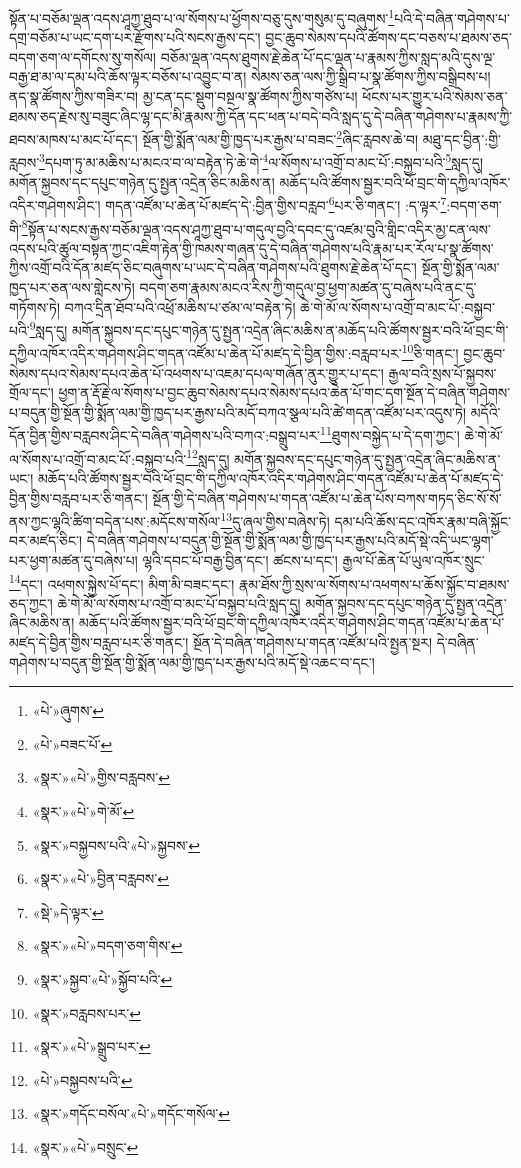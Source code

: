 སྟོན་པ་བཅོམ་ལྡན་འདས་ཤཱཀྱ་ཐུབ་པ་ལ་སོགས་པ་ཕྱོགས་བཅུ་དུས་གསུམ་དུ་བཞུགས་\footnote{«པེ་»ཞུགས་}པའི་དེ་བཞིན་གཤེགས་པ་དགྲ་བཅོམ་པ་ཡང་དག་པར་རྫོགས་པའི་སངས་རྒྱས་དང་། བྱང་ཆུབ་སེམས་དཔའི་ཚོགས་དང་བཅས་པ་ཐམས་ཅད་བདག་ཅག་ལ་དགོངས་སུ་གསོལ། བཅོམ་ལྡན་འདས་ཐུགས་རྗེ་ཆེན་པོ་དང་ལྡན་པ་རྣམས་ཀྱིས་སླད་མའི་དུས་ལྔ་བརྒྱ་ཐ་མ་ལ་དམ་པའི་ཆོས་ལྟར་བཅོས་པ་འབྱུང་བ་ན། སེམས་ཅན་ལས་ཀྱི་སྒྲིབ་པ་སྣ་ཚོགས་ཀྱིས་བསྒྲིབས་པ། ནད་སྣ་ཚོགས་ཀྱིས་གཟིར་བ། མྱ་ངན་དང་སྡུག་བསྔལ་སྣ་ཚོགས་ཀྱིས་གཙེས་པ། ཕོངས་པར་གྱུར་པའི་སེམས་ཅན་ཐམས་ཅད་རྗེས་སུ་བཟུང་ཞིང་ལྷ་དང་མི་རྣམས་ཀྱི་དོན་དང་ཕན་པ་བདེ་བའི་སླད་དུ་དེ་བཞིན་གཤེགས་པ་རྣམས་ཀྱི་ཐབས་མཁས་པ་མང་པོ་དང་། སྔོན་གྱི་སྨོན་ལམ་གྱི་ཁྱད་པར་རྒྱས་པ་བཟང་\footnote{«པེ་»བཟང་པོ་}ཞིང་རླབས་ཆེ་བ། མཐུ་དང་བྱིན་:གྱི་རླབས་\footnote{«སྣར་»«པེ་»གྱིས་བརླབས་}དཔག་ཏུ་མ་མཆིས་པ་མངའ་བ་ལ་བརྟེན་ཏེ་ཆེ་གེ་\footnote{«སྣར་»«པེ་»གེ་མོ་}ལ་སོགས་པ་འགྲོ་བ་མང་པོ་:བསྐྱབ་པའི་\footnote{«སྣར་»བསྐྱབས་པའི་«པེ་»སྐྱབས་}སླད་དུ། མགོན་སྐྱབས་དང་དཔུང་གཉེན་དུ་སྤྱན་འདྲེན་ཅིང་མཆིས་ན། མཆོད་པའི་ཚོགས་སྦྱར་བའི་ཕོ་བྲང་གི་དཀྱིལ་འཁོར་འདིར་གཤེགས་ཤིང་། གདན་འཛོམ་པ་ཆེན་པོ་མཛད་དེ་:བྱིན་གྱིས་བརླབ་\footnote{«སྣར་»«པེ་»བྱིན་བརླབས་}པར་ཅི་གནང་། :ད་ལྟར་\footnote{«སྡེ་»དེ་ལྟར་}:བདག་ཅག་གི་\footnote{«སྣར་»«པེ་»བདག་ཅག་གིས་}སྟོན་པ་སངས་རྒྱས་བཅོམ་ལྡན་འདས་ཤཱཀྱ་ཐུབ་པ་གདུལ་བྱའི་དབང་དུ་འཛམ་བུའི་གླིང་འདིར་མྱ་ངན་ལས་འདས་པའི་ཚུལ་བསྟན་ཀྱང་འཇིག་རྟེན་གྱི་ཁམས་གཞན་དུ་དེ་བཞིན་གཤེགས་པའི་རྣམ་པར་རོལ་པ་སྣ་ཚོགས་ཀྱིས་འགྲོ་བའི་དོན་མཛད་ཅིང་བཞུགས་པ་ཡང་དེ་བཞིན་གཤེགས་པའི་ཐུགས་རྗེ་ཆེན་པོ་དང་། སྔོན་གྱི་སྨོན་ལམ་ཁྱད་པར་ཅན་ལས་གླེངས་ཏེ། བདག་ཅག་རྣམས་མངའ་རིས་ཀྱི་གདུལ་བྱ་ཕྱག་མཚན་དུ་བཞེས་པའི་ནང་དུ་གཏོགས་ཏེ། བཀའ་དྲིན་ཐོབ་པའི་འཕྲོ་མཆིས་པ་ཙམ་ལ་བརྟེན་ཏེ། ཆེ་གེ་མོ་ལ་སོགས་པ་འགྲོ་བ་མང་པོ་:བསྐྱབ་པའི་\footnote{«སྣར་»སྐྱབ་«པེ་»སྐྱོབ་པའི་}སླད་དུ། མགོན་སྐྱབས་དང་དཔུང་གཉེན་དུ་སྤྱན་འདྲེན་ཞིང་མཆིས་ན་མཆོད་པའི་ཚོགས་སྦྱར་བའི་ཕོ་བྲང་གི་དཀྱིལ་འཁོར་འདིར་གཤེགས་ཤིང་གདན་འཛོམ་པ་ཆེན་པོ་མཛད་དེ་བྱིན་གྱིས་:བརླབ་པར་\footnote{«སྣར་»བརླབས་པར་}ཅི་གནང་། བྱང་ཆུབ་སེམས་དཔའ་སེམས་དཔའ་ཆེན་པོ་འཕགས་པ་འཇམ་དཔལ་གཞོན་ནུར་གྱུར་པ་དང་། རྒྱལ་བའི་སྲས་པོ་སྐྱབས་གྲོལ་དང་། ཕྱག་ན་རྡོ་རྗེ་ལ་སོགས་པ་བྱང་ཆུབ་སེམས་དཔའ་སེམས་དཔའ་ཆེན་པོ་གང་དག་སྔོན་དེ་བཞིན་གཤེགས་པ་བདུན་གྱི་སྔོན་གྱི་སྨོན་ལམ་གྱི་ཁྱད་པར་རྒྱས་པའི་མདོ་བཀའ་སྩལ་པའི་ཚེ་གདན་འཛོམ་པར་འདུས་ཏེ། མདོའི་དོན་བྱིན་གྱིས་བརླབས་ཤིང་དེ་བཞིན་གཤེགས་པའི་བཀའ་:བསྒྲུབ་པར་\footnote{«སྣར་»«པེ་»སྒྲུབ་པར་}ཐུགས་བསྐྱེད་པ་དེ་དག་ཀྱང་། ཆེ་གེ་མོ་ལ་སོགས་པ་འགྲོ་བ་མང་པོ་:བསྐྱབ་པའི་\footnote{«པེ་»བསྐྱབས་པའི་}སླད་དུ། མགོན་སྐྱབས་དང་དཔུང་གཉེན་དུ་སྤྱན་འདྲེན་ཞིང་མཆིས་ན་ཡང་། མཆོད་པའི་ཚོགས་སྦྱར་བའི་ཕོ་བྲང་གི་དཀྱིལ་འཁོར་འདིར་གཤེགས་ཤིང་གདན་འཛོམ་པ་ཆེན་པོ་མཛད་དེ་བྱིན་གྱིས་བརླབ་པར་ཅི་གནང་། སྔོན་གྱི་དེ་བཞིན་གཤེགས་པ་གདན་འཛོམ་པ་ཆེན་པོས་བཀས་གཏད་ཅིང་སོ་སོ་ནས་ཀྱང་ལྷའི་ཚིག་བདེན་པས་:མདོངས་གསོལ་\footnote{«སྣར་»གདོང་བསོལ་«པེ་»གདོང་གསོལ་}དུ་ཞལ་གྱིས་བཞེས་ཏེ། དམ་པའི་ཆོས་དང་འཁོར་རྣམ་བཞི་སྐྱོང་བར་མཛད་ཅིང་། དེ་བཞིན་གཤེགས་པ་བདུན་གྱི་སྔོན་གྱི་སྨོན་ལམ་གྱི་ཁྱད་པར་རྒྱས་པའི་མདོ་སྡེ་འདི་ཡང་ལྷག་པར་ཕྱག་མཚན་དུ་བཞེས་པ། ལྷའི་དབང་པོ་བརྒྱ་བྱིན་དང་། ཚངས་པ་དང་། རྒྱལ་པོ་ཆེན་པོ་ཡུལ་འཁོར་སྲུང་\footnote{«སྣར་»«པེ་»བསྲུང་}དང་། འཕགས་སྐྱེས་པོ་དང་། མིག་མི་བཟང་དང་། རྣམ་ཐོས་ཀྱི་སྲས་ལ་སོགས་པ་འཕགས་པ་ཆོས་སྐྱོང་བ་ཐམས་ཅད་ཀྱང་། ཆེ་གེ་མོ་ལ་སོགས་པ་འགྲོ་བ་མང་པོ་བསྐྱབ་པའི་སླད་དུ། མགོན་སྐྱབས་དང་དཔུང་གཉེན་དུ་སྤྱན་འདྲེན་ཞིང་མཆིས་ན། མཆོད་པའི་ཚོགས་སྦྱར་བའི་ཕོ་བྲང་གི་དཀྱིལ་འཁོར་འདིར་གཤེགས་ཤིང་གདན་འཛོམ་པ་ཆེན་པོ་མཛད་དེ་བྱིན་གྱིས་བརླབ་པར་ཅི་གནང་། སྔོན་དེ་བཞིན་གཤེགས་པ་གདན་འཛོམ་པའི་སྤྱན་སྔར། དེ་བཞིན་གཤེགས་པ་བདུན་གྱི་སྔོན་གྱི་སྨོན་ལམ་གྱི་ཁྱད་པར་རྒྱས་པའི་མདོ་སྡེ་འཆང་བ་དང་། 